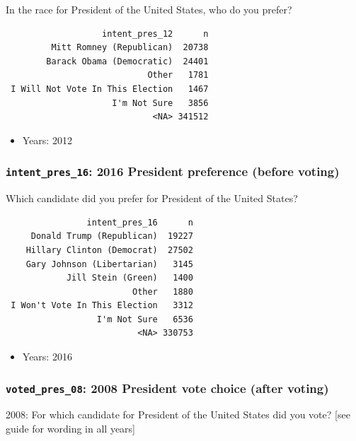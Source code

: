 \documentclass[10pt,article,oneside]{memoir}
\theoremstyle{definition}
\begin{document}
In the race for President of the United States, who do you prefer?

\begin{verbatim}
                   intent_pres_12      n
         Mitt Romney (Republican)  20738
        Barack Obama (Democratic)  24401
                            Other   1781
 I Will Not Vote In This Election   1467
                     I'm Not Sure   3856
                             <NA> 341512
\end{verbatim}

\begin{itemize}
\tightlist
\item
  Years: 2012
\end{itemize}

\hypertarget{intent_pres_16-2016-president-preference-before-voting}{%
\subsubsection{\texorpdfstring{\texttt{intent\_pres\_16}: 2016 President
preference (before
voting)}{intent\_pres\_16: 2016 President preference (before voting)}}\label{intent_pres_16-2016-president-preference-before-voting}}

Which candidate did you prefer for President of the United States?

\begin{verbatim}
                intent_pres_16      n
     Donald Trump (Republican)  19227
    Hillary Clinton (Democrat)  27502
    Gary Johnson (Libertarian)   3145
            Jill Stein (Green)   1400
                         Other   1880
 I Won't Vote In This Election   3312
                  I'm Not Sure   6536
                          <NA> 330753
\end{verbatim}

\begin{itemize}
\tightlist
\item
  Years: 2016
\end{itemize}

\hypertarget{voted_pres_08-2008-president-vote-choice-after-voting}{%
\subsubsection{\texorpdfstring{\texttt{voted\_pres\_08}: 2008 President
vote choice (after
voting)}{voted\_pres\_08: 2008 President vote choice (after voting)}}\label{voted_pres_08-2008-president-vote-choice-after-voting}}

2008: For which candidate for President of the United States did you
vote? {[}see guide for wording in all years{]}
\end{document}
